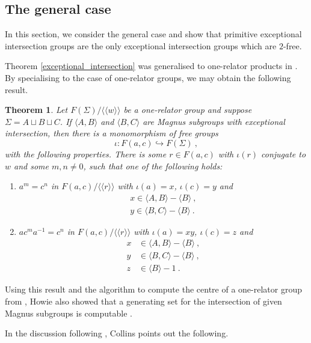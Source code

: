 \documentclass[11pt, a4paper]{amsart}
\newtheorem{theorem}{Theorem}[section]
\theoremstyle{definition}
\newcommand{\normal}[1]{\langle\langle #1 \rangle\rangle}
\def\injects{\hookrightarrow}
\begin{document}
\subsection{The general case}


In this section, we consider the general case and show that primitive exceptional intersection groups are the only exceptional intersection groups which are $2$-free.

Theorem \ref{exceptional_intersection} was generalised to one-relator products in \cite{howie_05}. By specialising \cite[Theorem C]{howie_05} to the case of one-relator groups, we may obtain the following result.

\begin{theorem}
\label{exceptional_intersection_improved}
Let $F(\Sigma)/\normal{w}$ be a one-relator group and suppose $\Sigma = A\sqcup B\sqcup C$. If $\langle A, B\rangle$ and $\langle B, C\rangle$ are Magnus subgroups with exceptional intersection, then there is a monomorphism of free groups 
\[
\iota: F(a, c)\injects F(\Sigma)~,
\]
with the following properties. There is some $r\in F(a, c)$ with $\iota(r)$ conjugate to $w$ and some $m, n\neq 0$, such that one of the following holds:
\begin{enumerate}
\item $a^m = c^n$ in $F(a, c)/\normal{r}$ with $\iota(a) = x$, $\iota(c) = y$ and
\begin{align*}
x\in \langle A, B\rangle - \langle B\rangle~,\\
y\in \langle B, C\rangle - \langle B\rangle~.
\end{align*}
\item $ac^ma^{-1} = c^n$ in $F(a, c)/\normal{r}$ with $\iota(a) = xy$, $\iota(c) = z$ and
\begin{align*}
x& \in \langle A, B\rangle - \langle B\rangle~,\\
y & \in\langle B, C\rangle - \langle B\rangle~,\\
z & \in \langle B\rangle - 1~.
\end{align*}
\end{enumerate}
\end{theorem}

Using this result and the algorithm to compute the centre of a one-relator group from \cite{baumslag_67_centre}, Howie also showed that a generating set for the intersection of given Magnus subgroups is computable \cite[Theorem E]{howie_05}.

In the discussion following \cite[Theorem 4]{collins_04}, Collins points out the following.
\end{document}
